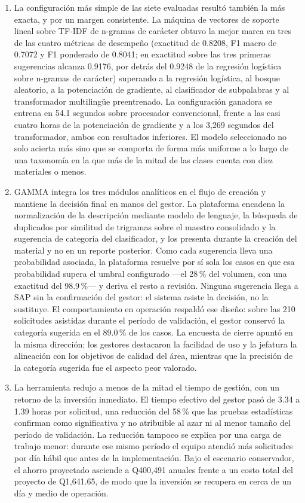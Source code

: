 \begin{enumerate}
	\item La configuración más simple de las siete evaluadas resultó también la más exacta, y por un margen consistente. La máquina de vectores de soporte lineal sobre TF-IDF de n-gramas de carácter obtuvo la mejor marca en tres de las cuatro métricas de desempeño (exactitud de 0.8208, F1 macro de 0.7072 y F1 ponderado de 0.8041; en exactitud sobre las tres primeras sugerencias alcanza 0.9176, por detrás del 0.9248 de la regresión logística sobre n-gramas de carácter) superando a la regresión logística, al bosque aleatorio, a la potenciación de gradiente, al clasificador de subpalabras y al transformador multilingüe preentrenado. La configuración ganadora se entrena en 54.1 segundos sobre procesador convencional, frente a las casi cuatro horas de la potenciación de gradiente y a los 3,269 segundos del transformador, ambos con resultados inferiores. El modelo seleccionado no solo acierta más sino que se comporta de forma más uniforme a lo largo de una taxonomía en la que más de la mitad de las clases cuenta con diez materiales o menos.

	\item GAMMA integra los tres módulos analíticos en el flujo de creación y mantiene la decisión final en manos del gestor. La plataforma encadena la normalización de la descripción mediante modelo de lenguaje, la búsqueda de duplicados por similitud de trigramas sobre el maestro consolidado y la sugerencia de categoría del clasificador, y los presenta durante la creación del material y no en un reporte posterior. Como cada sugerencia lleva una probabilidad asociada, la plataforma resuelve por sí sola los casos en que esa probabilidad supera el umbral configurado —el 28\,\% del volumen, con una exactitud del 98.9\,\%— y deriva el resto a revisión. Ninguna sugerencia llega a SAP sin la confirmación del gestor: el sistema asiste la decisión, no la sustituye. El comportamiento en operación respaldó ese diseño: sobre las 210 solicitudes asistidas durante el período de validación, el gestor conservó la categoría sugerida en el 89.0\,\% de los casos. La encuesta de cierre apuntó en la misma dirección; los gestores destacaron la facilidad de uso y la jefatura la alineación con los objetivos de calidad del área, mientras que la precisión de la categoría sugerida fue el aspecto peor valorado.

	\item La herramienta redujo a menos de la mitad el tiempo de gestión, con un retorno de la inversión inmediato. El tiempo efectivo del gestor pasó de 3.34 a 1.39 horas por solicitud, una reducción del 58\,\% que las pruebas estadísticas confirman como significativa y no atribuible al azar ni al menor tamaño del período de validación. La reducción tampoco se explica por una carga de trabajo menor: durante ese mismo período el equipo atendió más solicitudes por día hábil que antes de la implementación. Bajo el escenario conservador, el ahorro proyectado asciende a Q400,491 anuales frente a un costo total del proyecto de Q1,641.65, de modo que la inversión se recupera en cerca de un día y medio de operación.
\end{enumerate}

